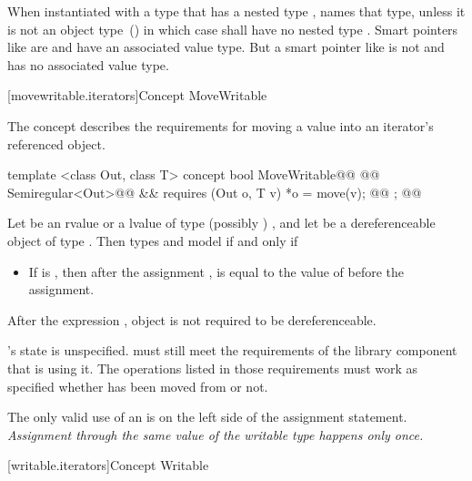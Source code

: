 \begin{addedblock}
\pnum
When instantiated with a type  that has a nested type ,
 names that type, unless it is not an object type~() in which case
 shall have no nested type . \enternote Smart pointers like
 are  and have an associated value type. But a smart pointer
like  is not  and has no associated value type.\exitnote

[movewritable.iterators]{Concept MoveWritable}

\pnum
The  concept describes the requirements for moving a value into an iterator's
referenced object.

%
\begin{codeblock}
  template <class Out, class T>
  concept bool MoveWritable@\newtxt{() \{}\oldtxt{ =}@
    @@ Semiregular<Out>@\newtxt{()}@ &&
      requires (Out o, T v) {
        *o = move(v); @@
      };
  @\newtxt{\}}@
\end{codeblock}

\pnum
Let  be an rvalue or a lvalue of type (possibly ) , and let 
be a dereferenceable object of type . Then types  and
 model  if and only if

\begin{itemize}
\item If  is ,
then after the assignment ,  is equal
to the value of  before the assignment.
\end{itemize}

\pnum
After the expression , object  is not required to be dereferenceable.

\pnum
{}'s state is unspecified. \enternote {} must still meet the
requirements of the library component that is using it. The operations listed
in those requirements must work as specified whether  has been moved
from or not.\exitnote

\pnum
\enternote
The only valid use of an  is on the left side of the assignment statement.
\textit{Assignment through the same value of the writable type happens only once.}
\exitnote

[writable.iterators]{Concept Writable}


\end{addedblock}
